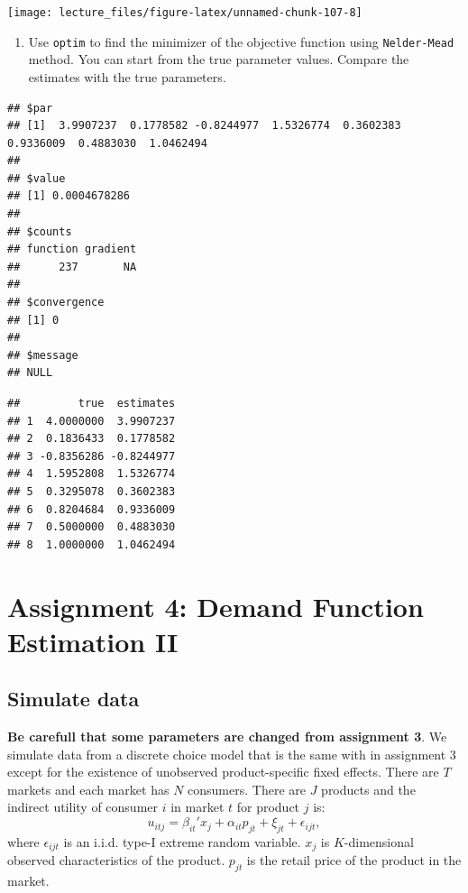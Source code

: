 \documentclass[
]{book}
\providecommand{\tightlist}{%
  \setlength{\itemsep}{0pt}\setlength{\parskip}{0pt}}
\begin{document}
\begin{center}\texttt{[image: lecture\_files/figure-latex/unnamed-chunk-107-8]} \end{center}

\begin{enumerate}
\def\labelenumi{\arabic{enumi}.}
\setcounter{enumi}{7}
\tightlist
\item
  Use \texttt{optim} to find the minimizer of the objective function using \texttt{Nelder-Mead} method. You can start from the true parameter values. Compare the estimates with the true parameters.
\end{enumerate}

\begin{verbatim}
## $par
## [1]  3.9907237  0.1778582 -0.8244977  1.5326774  0.3602383  0.9336009  0.4883030  1.0462494
## 
## $value
## [1] 0.0004678286
## 
## $counts
## function gradient 
##      237       NA 
## 
## $convergence
## [1] 0
## 
## $message
## NULL
\end{verbatim}

\begin{verbatim}
##         true  estimates
## 1  4.0000000  3.9907237
## 2  0.1836433  0.1778582
## 3 -0.8356286 -0.8244977
## 4  1.5952808  1.5326774
## 5  0.3295078  0.3602383
## 6  0.8204684  0.9336009
## 7  0.5000000  0.4883030
## 8  1.0000000  1.0462494
\end{verbatim}

\hypertarget{assignment4}{%
\chapter{Assignment 4: Demand Function Estimation II}\label{assignment4}}

\hypertarget{simulate-data-3}{%
\section{Simulate data}\label{simulate-data-3}}

\textbf{Be carefull that some parameters are changed from assignment 3}. We simulate data from a discrete choice model that is the same with in assignment 3 except for the existence of unobserved product-specific fixed effects. There are \(T\) markets and each market has \(N\) consumers. There are \(J\) products and the indirect utility of consumer \(i\) in market \(t\) for product \(j\) is:
\[
u_{itj} = \beta_{it}' x_j + \alpha_{it} p_{jt} + \xi_{jt} + \epsilon_{ijt},
\]
where \(\epsilon_{ijt}\) is an i.i.d. type-I extreme random variable. \(x_j\) is \(K\)-dimensional observed characteristics of the product. \(p_{jt}\) is the retail price of the product in the market.
\end{document}
